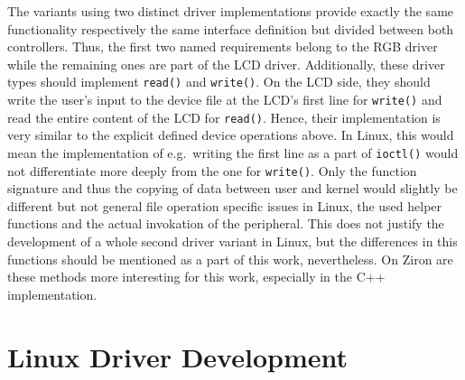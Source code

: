The variants using two distinct driver implementations provide exactly the same functionality respectively the same interface definition but divided between both controllers.
Thus, the first two named requirements belong to the RGB driver while the remaining ones are part of the LCD driver.
Additionally, these driver types should implement \texttt{read()} and \texttt{write()}.
On the LCD side, they should write the user's input to the device file at the LCD's first line for \texttt{write()} and read the entire content of the LCD for \texttt{read()}.
Hence, their implementation is very similar to the explicit defined device operations above.
In Linux, this would mean the implementation of e.g.\ writing the first line as a part of \texttt{ioctl()} would not differentiate more deeply from the one for \texttt{write()}.
Only the function signature and thus the copying of data between user and kernel would slightly be different but not general file operation specific issues in Linux, the used helper functions and the actual invokation of the peripheral.
This does not justify the development of a whole second driver variant in Linux, but the differences in this functions should be mentioned as a part of this work, nevertheless.
On Ziron are these methods more interesting for this work, especially in the C++ implementation.


\section{Linux Driver Development}\label{sec:cs-linux}

